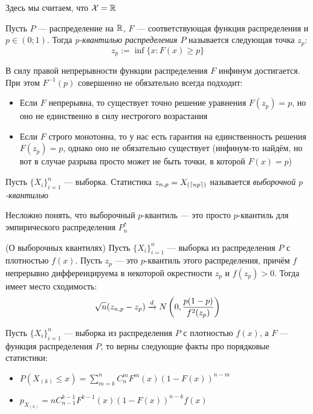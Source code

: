 \begin{note}
	Здесь мы считаем, что $\mathcal{X} = \mathbb{R}$
\end{note}

\begin{definition}
	Пусть $P$ --- распределение на $\mathbb{R}$, $F$ --- соответствующая функция распределения и $p \in (0; 1)$. Тогда \textit{p-квантилью распределения $P$} называется следующая точка $z_p$:
	\[
		z_p := \inf \{x \colon F(x) \ge p\}
	\]
\end{definition}

\begin{note}
	В силу правой непрерывности функции распределения $F$ инфинум достигается. При этом $F^{-1}(p)$ совершенно не обязательно всегда подходит:
	\begin{itemize}
		\item Если $F$ непрерывна, то существует точно решение уравнения $F(z_p) = p$, но оно не единственно в силу нестрогого возрастания
		
		\item Если $F$ строго монотонна, то у нас есть гарантия на единственность решения $F(z_p) = p$, однако оно не обязательно существует (инфинум-то найдём, но вот в случае разрыва просто может не быть точки, в которой $F(x) = p$)
	\end{itemize}
\end{note}

\begin{definition}
	Пусть $\{X_i\}_{i = 1}^n$ --- выборка. Статистика $z_{n, p} = X_{(\left\lceil np\right\rceil)}$ называется \textit{выборочной $p$-квантилью}
\end{definition}

\begin{note}
	Несложно понять, что выборочный $p$-квантиль --- это просто $p$-квантиль для эмпирического распределения $P_n^*$
\end{note}

\begin{theorem} (О выборочных квантилях)
	Пусть $\{X_i\}_{i = 1}^n$ --- выборка из распределения $P$ с плотностью $f(x)$. Пусть $z_p$ --- это $p$-квантиль этого распределения, причём $f$ непрерывно дифференцируема в некоторой окрестности $z_p$ и $f(z_p) > 0$. Тогда имеет место сходимость:
	\[
		\sqrt{n}(z_{n, p} - z_p) \xrightarrow{d} N\left(0, \frac{p(1 - p)}{f^2(z_p)}\right)
	\]
\end{theorem}

\begin{reminder}
	Пусть $\{X_i\}_{i = 1}^n$ --- выборка из распределения $P$ с плотностью $f(x)$, а $F$ --- функция распределения $P$, то верны следующие факты про порядковые статистики:
	\begin{itemize}
		\item $P(X_{(k)} \le x) = \sum_{m = k}^n C_n^m F^m(x)(1 - F(x))^{n - m}$
		
		\item $p_{X_{(k)}} = n C_{n - 1}^{k - 1} F^{k - 1}(x)(1 - F(x))^{n - k}f(x)$
	\end{itemize}
\end{reminder}

